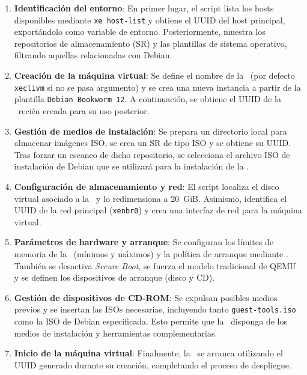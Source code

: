 \begin{enumerate}
    \item \textbf{Identificación del entorno}:  
    En primer lugar, el script lista los hosts disponibles mediante \texttt{xe host-list} y obtiene el UUID del host principal, exportándolo como variable de entorno. Posteriormente, muestra los repositorios de almacenamiento (SR) y las plantillas de sistema operativo, filtrando aquellas relacionadas con Debian.

    \item \textbf{Creación de la máquina virtual}:  
    Se define el nombre de la \VM\ (por defecto \texttt{xeclivm} si no se pasa argumento) y se crea una nueva instancia a partir de la plantilla \texttt{Debian Bookworm 12}. A continuación, se obtiene el UUID de la \VM\ recién creada para su uso posterior.

    \item \textbf{Gestión de medios de instalación}:  
    Se prepara un directorio local para almacenar imágenes ISO, se crea un SR de tipo ISO y se obtiene su UUID. Tras forzar un escaneo de dicho repositorio, se selecciona el archivo ISO de instalación de Debian que se utilizará para la instalación de la \VM.

    \item \textbf{Configuración de almacenamiento y red}:  
    El script localiza el disco virtual asociado a la \VM\ y lo redimensiona a 20~GiB. Asimismo, identifica el UUID de la red principal (\texttt{xenbr0}) y crea una interfaz de red para la máquina virtual.

    \item \textbf{Parámetros de hardware y arranque}:  
    Se configuran los límites de memoria de la \VM\ (mínimos y máximos) y la política de arranque mediante \BIOS. También se desactiva \textit{Secure Boot}, se fuerza el modelo tradicional de QEMU y se definen los dispositivos de arranque (disco y CD).  

    \item \textbf{Gestión de dispositivos de CD-ROM}:  
    Se expulsan posibles medios previos y se insertan las ISOs necesarias, incluyendo tanto \texttt{guest-tools.iso} como la ISO de Debian especificada. Esto permite que la \VM\ disponga de los medios de instalación y herramientas complementarias.

    \item \textbf{Inicio de la máquina virtual}:  
    Finalmente, la \VM\ se arranca utilizando el UUID generado durante su creación, completando el proceso de despliegue.

\end{enumerate}

